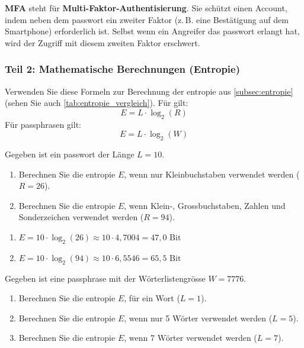 \documentclass[12pt,a4paper]{article}
\begin{document}
\begin{solutionbox}
\textbf{MFA} steht für \textbf{Multi-Faktor-Authentisierung}. Sie schützt einen Account, indem neben dem \gls{passwort} ein zweiter Faktor (z.\,B. eine Bestätigung auf dem Smartphone) erforderlich ist. Selbst wenn ein Angreifer das \gls{passwort} erlangt hat, wird der Zugriff mit diesem zweiten Faktor erschwert.
\end{solutionbox}

\newpage
\subsubsection{Teil 2: Mathematische Berechnungen (Entropie)}

Verwenden Sie diese Formeln zur Berechnung der \gls{entropie} aus \cref{subsec:entropie} \newline(sehen Sie auch \cref{tab:entropie_vergleich}).
Für  gilt:
\[
E = L \cdot \log_2(R)
\]
Für \gls{passphrase}n gilt:
\[
E = L \cdot \log_2(W)
\]

\begin{taskbox}
Gegeben ist ein \gls{passwort} der Länge $L = 10$.
\begin{enumerate}[label=\alph*)]
    \item Berechnen Sie die \gls{entropie} $E$, wenn nur Kleinbuchstaben verwendet werden \newline($R = 26$).
    \item Berechnen Sie die \gls{entropie} $E$, wenn Klein-, Grossbuchstaben, Zahlen und Sonderzeichen verwendet werden ($R = 94$).
\end{enumerate}
\end{taskbox}

\begin{solutionbox}
\begin{enumerate}[label=\alph*)]
    \item $E = 10 \cdot \log_2(26) \approx 10 \cdot 4{,}7004 = 47{,}0 \text{ Bit}$
    \item $E = 10 \cdot \log_2(94) \approx 10 \cdot 6{,}5546 = 65{,}5 \text{ Bit}$
\end{enumerate}
\end{solutionbox}

\begin{taskbox}
Gegeben ist eine \gls{passphrase} mit der Wörterlistengrösse $W = 7776$.
\begin{enumerate}[label=\alph*)]
    \item Berechnen Sie die \gls{entropie} $E$, für ein Wort ($L = 1$).
    \item Berechnen Sie die \gls{entropie} $E$, wenn nur 5 Wörter verwendet werden \newline($L = 5$).
    \item Berechnen Sie die \gls{entropie} $E$, wenn 7 Wörter verwendet werden ($L = 7$).
\end{enumerate}
\end{taskbox}
\end{document}
